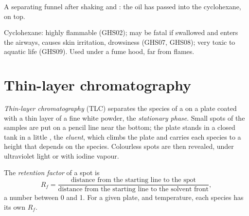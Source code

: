 \begin{omfigure}

{\small A separating funnel after shaking and : the oil has passed
into the cyclohexane, on top.}
\end{omfigure}

\begin{safety}{}
Cyclohexane: highly flammable (GHS02); may be fatal if swallowed and
enters the airways, causes skin irritation, drowsiness (GHS07, GHS08);
very toxic to aquatic life (GHS09). Used under a fume hood, far from
flames.
\end{safety}

\section{Thin-layer chromatography}

\begin{definition}\label{def:g10:chemical-species:tlc}
\emph{Thin-layer chromatography} (TLC)
separates the species of a  on a plate coated with a thin layer of
a fine white powder, the \emph{stationary phase}.
Small spots of the samples are put on a pencil line near the bottom; the
plate stands in a closed tank in a little , the
\emph{eluent}, which climbs the plate and carries each
species to a height that depends on the species. Colourless spots are
then revealed, under ultraviolet light or with iodine vapour.
\end{definition}

\begin{definition}\label{def:g10:chemical-species:retention-factor}
The \emph{retention factor} of a spot is
\[
  R_f = \frac{\text{distance from the starting line to the spot}}
             {\text{distance from the starting line to the solvent front}},
\]
a number between 0 and 1. For a given plate,  and temperature,
each species has its own $R_f$.
\end{definition}

